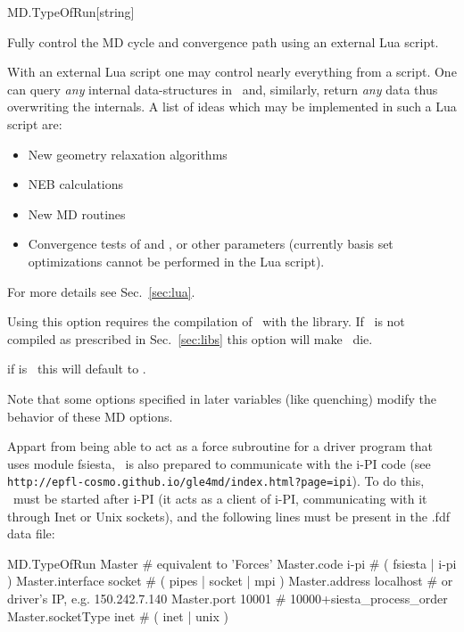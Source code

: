 \begin{fdfentry}{MD.TypeOfRun}[string]
\begin{fdfoptions}
    \option[Lua]%
    Fully control the MD cycle and convergence path using an external
    Lua script. 

    With an external Lua script one may control nearly everything from
    a script. One can query \emph{any} internal data-structures in
    \siesta\ and, similarly, return \emph{any} data thus overwriting
    the internals. A list of ideas which may be implemented in such a
    Lua script are:
    \begin{itemize}
      \item New geometry relaxation algorithms

      \item NEB calculations

      \item New MD routines

      \item Convergence tests of  and
      , or other parameters (currently basis
      set optimizations cannot be performed in the Lua script).

    \end{itemize}
    For more details see Sec.~\ref{sec:lua}.

    Using this option requires the compilation of \siesta\ with the
     library.%
    If \siesta\ is not compiled as prescribed in Sec.~\ref{sec:libs}
    this option will make \siesta\ die.

  \end{fdfoptions}

  \note if  is \fdftrue\ this will default
  to .

  Note that some options specified in later variables (like quenching)
  modify the behavior of these MD options.

  Appart from being able to act as a force subroutine for a driver
  program that uses module fsiesta, \siesta\ is also prepared to
  communicate with the i-PI code (see
  \texttt{http://epfl-cosmo.github.io/gle4md/index.html?page=ipi}).
  To do this, \siesta\ must be started after i-PI (it acts as a client
  of i-PI, communicating with it through Inet or Unix sockets), and
  the following lines must be present in the .fdf data file:
  \begin{fdfexample}
     MD.TypeOfRun      Master     # equivalent to 'Forces'
     Master.code       i-pi       # ( fsiesta | i-pi )
     Master.interface  socket     # ( pipes | socket | mpi )
     Master.address    localhost  # or driver's IP, e.g. 150.242.7.140
     Master.port       10001      # 10000+siesta_process_order
     Master.socketType inet       # ( inet | unix )
  \end{fdfexample}

\end{fdfentry}



